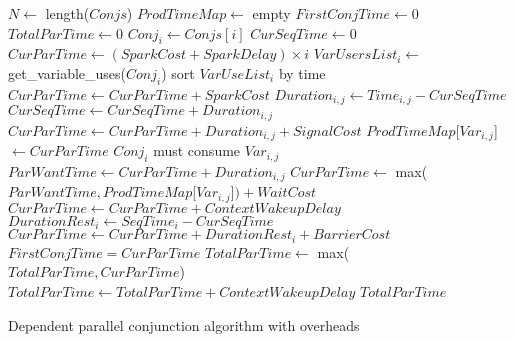 \begin{algorithm}[tbp]
\begin{algorithmic}[5]
    \State $N \gets$ length($Conjs$)
    \State $ProdTimeMap \gets$ empty
    \State $FirstConjTime \gets 0$
    \State $TotalParTime \gets 0$
        \State $Conj_i \gets Conjs[i]$
        \State $CurSeqTime \gets 0$
        \State $CurParTime \gets (SparkCost + SparkDelay) \times i$
        \State $VarUsersList_i \gets$ get\_variable\_uses($Conj_i$) 
        \State sort $VarUseList_i$ by time
            \State $CurParTime \gets CurParTime + SparkCost$
        \EndIf
            \State $Duration_{i, j} \gets Time_{i, j} - CurSeqTime$
            \State $CurSeqTime \gets CurSeqTime + Duration_{i, j}$
                \State $CurParTime \gets
                    CurParTime + Duration_{i, j} + SignalCost$
                \State $ProdTimeMap$[$Var_{i, j}$]$ \gets CurParTime$
            \Else
                \Comment $Conj_i$ must consume $Var_{i, j}$
                \State $ParWantTime \gets CurParTime + Duration_{i, j}$
                \State $CurParTime \gets$
                    max($ParWantTime, ProdTimeMap$[$Var_{i, j}$]$) + WaitCost$
                    \State $CurParTime \gets CurParTime + ContextWakeupDelay$
                \EndIf
            \EndIf
        \EndFor
        \State $DurationRest_i \gets SeqTime_i - CurSeqTime$
        \State $CurParTime \gets CurParTime + DurationRest_i + BarrierCost$
            \State $FirstConjTime = CurParTime$
        \EndIf
        \State $TotalParTime \gets$ max($TotalParTime, CurParTime$)
    \EndFor
        \State $TotalParTime \gets TotalParTime + ContextWakeupDelay$
    \EndIf
    \State \Return $TotalParTime$
\EndProcedure
\end{algorithmic}
\caption{Dependent parallel conjunction algorithm with overheads}
\label{alg:dep_par_conj_overlap_complete}
\end{algorithm}

